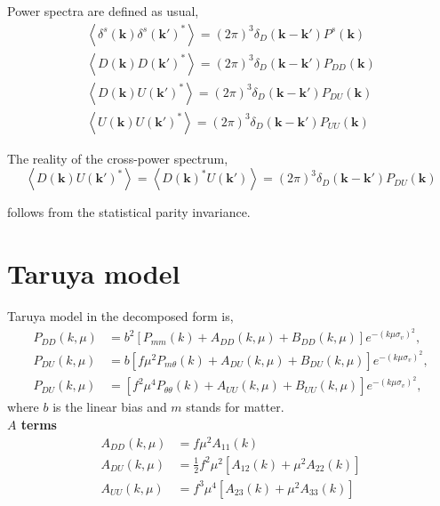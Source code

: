 \documentclass[a4paper,11pt, fleqn]{article}
\begin{document}
\vspace{10mm}
Power spectra are defined as usual,
\begin{align}
  \left\langle \delta^s(\bm{k}) \delta^s(\bm{k}')^* \right\rangle
    = (2\pi)^3 \delta_D(\bm{k} - \bm{k}') P^s(\bm{k})\\
  \left\langle D(\bm{k}) D(\bm{k}')^* \right\rangle
    = (2\pi)^3 \delta_D(\bm{k} - \bm{k}') P_{DD}(\bm{k})\\
  \left\langle D(\bm{k}) U(\bm{k}')^* \right\rangle
    = (2\pi)^3 \delta_D(\bm{k} - \bm{k}') P_{DU}(\bm{k})\\
  \left\langle U(\bm{k}) U(\bm{k}')^* \right\rangle
    = (2\pi)^3 \delta_D(\bm{k} - \bm{k}') P_{UU}(\bm{k})
\end{align}

\vspace{10mm}
The reality of the cross-power spectrum,
%
\begin{equation}
  \left\langle D(\bm{k}) U(\bm{k}')^* \right\rangle =
  \left\langle D(\bm{k})^* U(\bm{k}') \right\rangle =
  (2\pi)^3 \delta_D(\bm{k} - \bm{k}') P_{DU}(\bm{k})
\end{equation}

follows from the statistical parity invariance. 


%
%
\newpage
\section{Taruya model}

\vspace{5mm}

Taruya model in the decomposed form is,\vspace{-2mm}
\begin{align}
  P_{DD}(k, \mu) &= b^2 \left[
    P_{mm}(k) + A_{DD}(k, \mu) + B_{DD}(k, \mu)
    \right] e^{- (k\mu\sigma_v)^2},\\
  P_{DU}(k, \mu) &= b \left[
    f\mu^2 P_{m\theta}(k) + A_{DU}(k, \mu) + B_{DU}(k, \mu)
    \right] e^{- (k\mu\sigma_v)^2},\\
  P_{DU}(k, \mu) &= \left[
    f^2 \mu^4 P_{\theta\theta}(k) + A_{UU}(k, \mu) + B_{UU}(k, \mu)
    \right] e^{- (k\mu\sigma_v)^2},   
\end{align}
where $b$ is the linear bias and $m$ stands for matter.\\


\textbf{$A$ terms}\vspace{-2mm}
\begin{align}
  A_{DD}(k, \mu) &= f\mu^2 A_{11}(k)\\
  A_{DU}(k, \mu) &= \frac{1}{2} f^2 \mu^2 \left[
                   A_{12}(k) + \mu^2 A_{22}(k) \right]\\
  A_{UU}(k, \mu) &= f^3 \mu^4 \left[ A_{23}(k) + \mu^2 A_{33}(k) \right]
\end{align}
\end{document}
